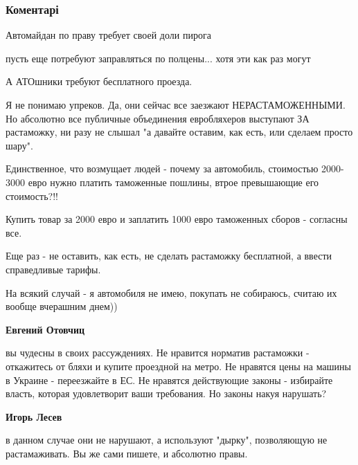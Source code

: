  
 
 
 
 
\subsubsection{Коментарі}
\label{sec:11_07_2018.fb.lesev_igor.1.po_bljaheram.cmt}

\begin{itemize} %
Автомайдан по праву требует своей доли пирога

\begin{itemize} %
пусть еще потребуют заправляться по полцены... хотя эти как раз могут

А АТОшники требуют бесплатного проезда.


Я не понимаю упреков. Да, они сейчас все заезжают НЕРАСТАМОЖЕННЫМИ. Но
абсолютно все публичные объединения евробляхеров выступают ЗА растаможку, ни
разу не слышал "а давайте оставим, как есть, или сделаем просто шару".

Единственное, что возмущает людей - почему за автомобиль, стоимостью 2000-3000
евро нужно платить таможенные пошлины, втрое превышающие его стоимость?!!

Купить товар за 2000 евро и заплатить 1000 евро таможенных сборов - согласны
все.

Еще раз - не оставить, как есть, не сделать растаможку бесплатной, а ввести
справедливые тарифы.

На всякий случай - я автомобиля не имею, покупать не собираюсь, считаю их
вообще вчерашним днем))

\textbf{Евгений Отовчиц} 

вы чудесны в своих рассуждениях. Не нравится норматив растаможки - откажитесь
от бляхи и купите проездной на метро. Не нравятся цены на машины в Украине -
переезжайте в ЕС. Не нравятся действующие законы - избирайте власть, которая
удовлетворит ваши требования. Но законы накуя нарушать?

\textbf{Игорь Лесев} 

в данном случае они не нарушают, а используют "дырку", позволяющую не
растамаживать. Вы же сами пишете, и абсолютно правы.


\end{itemize}
\end{itemize}

